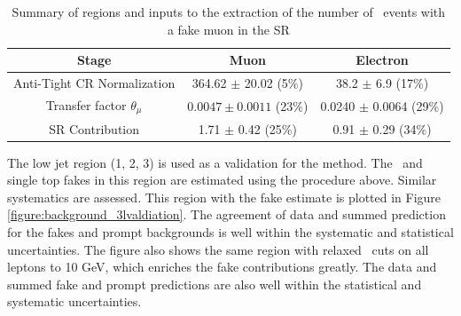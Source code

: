 \begin{table}[!htbp]
\begin{center} 
\begin{tabular}{|c|c|c|} 
  \hline
  Stage   & Muon & Electron \\
  \hline
  Anti-Tight CR Normalization  &  364.62 $\pm$ 20.02 (5$\%$) & 38.2 $\pm$ 6.9 (17\%) \\ 
  \hline  
  Transfer factor $\theta_\mu$ & $0.0047 \pm 0.0011$ (23$\%$) & 0.0240 $\pm$ 0.0064 (29\%) \\
  SR Contribution & 1.71 $\pm$ 0.42 (25\%)           & 0.91 $\pm$ 0.29 (34\%) \\ 
  \hline  
\end{tabular}
\caption{Summary of regions and inputs to the extraction of the number of \ttbar\ events with a fake muon in the SR}
\label{table:background_3l_summary}
\end{center}
\end{table}


The low jet region (1, 2, 3) is used as a validation for the method. The \ttbar\ and single top fakes in this region are estimated using the procedure above. Similar systematics are assessed. This region with the fake estimate is plotted in Figure \ref{figure:background_3lvaldiation}. The agreement of data and summed prediction for the fakes and prompt backgrounds is well within the systematic and statistical uncertainties. The figure also shows the same region with relaxed \pt\ cuts on all leptons to 10 GeV, which enriches the fake contributions greatly.   The data and summed fake and prompt predictions are also well within the statistical and systematic uncertainties.


